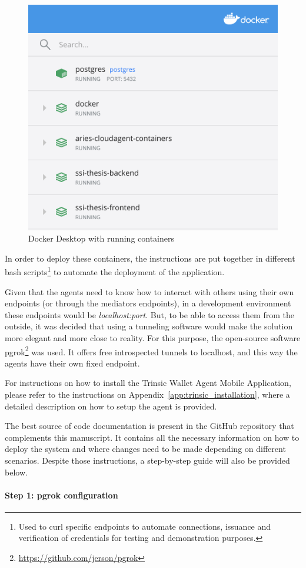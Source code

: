 \begin{figure}[!htb]
    \centering
    \includegraphics[keepaspectratio=true, width=0.5\linewidth]{images/docker-desktop.png}
    \caption{Docker Desktop with running containers}
    \label{fig:docker-desktop}
\end{figure}

In order to deploy these containers, the instructions are put together in different bash scripts\footnote{Used to curl specific endpoints to automate connections, issuance and verification of credentials for testing and demonstration purposes.} to automate the deployment of the application.

Given that the agents need to know how to interact with others using their own endpoints (or through the mediators endpoints), in a development environment these endpoints would be \textit{localhost:port}. But, to be able to access them from the outside, it was decided that using a tunneling software would make the solution more elegant and more close to reality. For this purpose, the open-source software pgrok\footnote{\url{https://github.com/jerson/pgrok}} was used. It offers free introspected tunnels to localhost, and this way the agents have their own fixed endpoint. 

For instructions on how to install the Trinsic Wallet Agent Mobile Application, please refer to the instructions on Appendix~\ref{app:trinsic_installation}, where a detailed description on how to setup the agent is provided.

The best source of code documentation is present in the GitHub repository that complements this manuscript. It contains all the necessary information on how to deploy the system and where changes need to be made depending on different scenarios.
Despite those instructions, a step-by-step guide will also be provided below.

\paragraph{Step 1: pgrok configuration}

